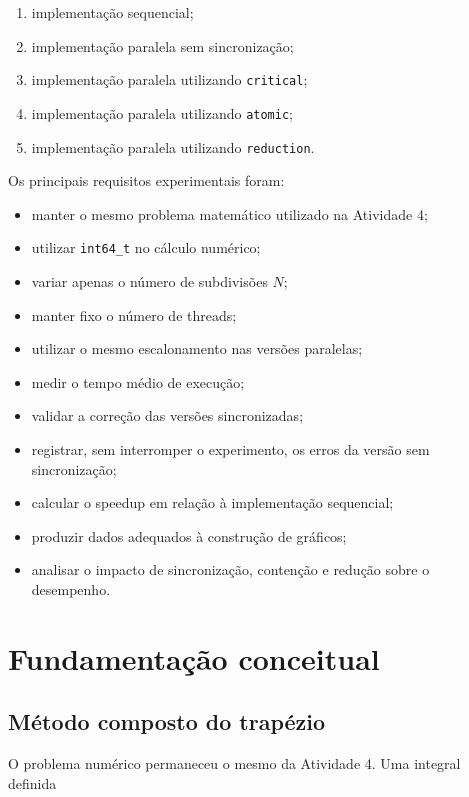 \begin{enumerate}
    \item implementação sequencial;
    \item implementação paralela sem sincronização;
    \item implementação paralela utilizando \texttt{critical};
    \item implementação paralela utilizando \texttt{atomic};
    \item implementação paralela utilizando \texttt{reduction}.
\end{enumerate}

Os principais requisitos experimentais foram:

\begin{itemize}
    \item manter o mesmo problema matemático utilizado na Atividade 4;
    \item utilizar \texttt{int64\_t} no cálculo numérico;
    \item variar apenas o número de subdivisões \(N\);
    \item manter fixo o número de threads;
    \item utilizar o mesmo escalonamento nas versões paralelas;
    \item medir o tempo médio de execução;
    \item validar a correção das versões sincronizadas;
    \item registrar, sem interromper o experimento, os erros da versão sem
    sincronização;
    \item calcular o speedup em relação à implementação sequencial;
    \item produzir dados adequados à construção de gráficos;
    \item analisar o impacto de sincronização, contenção e redução sobre o
    desempenho.
\end{itemize}


\section{Fundamentação conceitual}

\label{sec:atvd06-fundamentacao}

\subsection{Método composto do trapézio}

O problema numérico permaneceu o mesmo da Atividade 4. Uma integral definida

